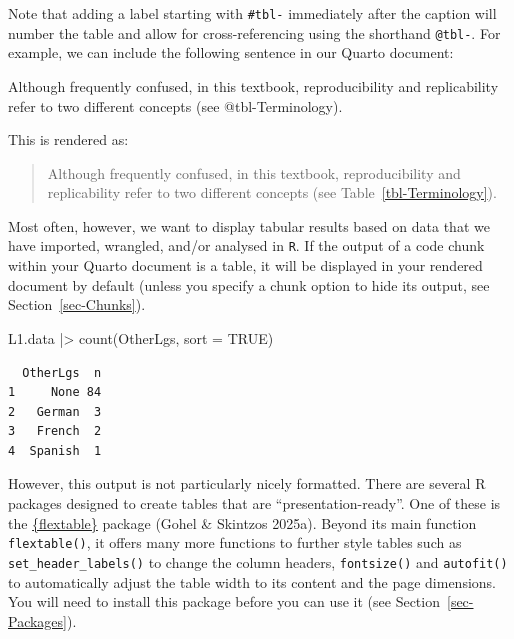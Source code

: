 \documentclass[
  letterpaper,
  DIV=11,
  numbers=noendperiod]{scrreprt}
\newenvironment{Shaded}{\begin{snugshade}}{\end{snugshade}}
\newcommand{\AttributeTok}[1]{\textcolor[rgb]{0.40,0.45,0.13}{#1}}
\newcommand{\ConstantTok}[1]{\textcolor[rgb]{0.56,0.35,0.01}{#1}}
\newcommand{\FunctionTok}[1]{\textcolor[rgb]{0.28,0.35,0.67}{#1}}
\newcommand{\NormalTok}[1]{\textcolor[rgb]{0.00,0.23,0.31}{#1}}
\newcommand{\SpecialCharTok}[1]{\textcolor[rgb]{0.37,0.37,0.37}{#1}}
\begin{document}
Note that adding a label starting with \texttt{\#tbl-} immediately after
the caption will number the table and allow for cross-referencing using
the shorthand \texttt{@tbl-}. For example, we can include the following
sentence in our Quarto document:

\begin{Shaded}
\begin{Highlighting}[]
\NormalTok{Although frequently confused, in this textbook, reproducibility and replicability refer to two different concepts (see @tbl{-}Terminology).}
\end{Highlighting}
\end{Shaded}

This is rendered as:

\begin{quote}
Although frequently confused, in this textbook, reproducibility and
replicability refer to two different concepts (see
Table~\ref{tbl-Terminology}).
\end{quote}

Most often, however, we want to display tabular results based on data
that we have imported, wrangled, and/or analysed in \texttt{R}. If the
output of a code chunk within your Quarto document is a table, it will
be displayed in your rendered document by default (unless you specify a
chunk option to hide its output, see Section~\ref{sec-Chunks}).

\begin{Shaded}
\begin{Highlighting}[]
\NormalTok{L1.data }\SpecialCharTok{|\textgreater{}} 
  \FunctionTok{count}\NormalTok{(OtherLgs,}
        \AttributeTok{sort =} \ConstantTok{TRUE}\NormalTok{)}
\end{Highlighting}
\end{Shaded}

\begin{verbatim}
  OtherLgs  n
1     None 84
2   German  3
3   French  2
4  Spanish  1
\end{verbatim}

However, this output is not particularly nicely formatted. There are
several R packages designed to create tables that are
``presentation-ready''. One of these is the
\href{https://ardata-fr.github.io/flextable-book/}{\{flextable\}}
package (Gohel \& Skintzos 2025a). Beyond its main function
\texttt{flextable()}, it offers many more functions to further style
tables such as \texttt{set\_header\_labels()} to change the column
headers, \texttt{fontsize()} and \texttt{autofit()} to automatically
adjust the table width to its content and the page dimensions. You will
need to install this package before you can use it (see
Section~\ref{sec-Packages}).
\end{document}
